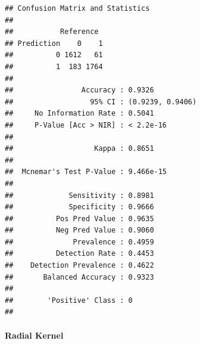 \documentclass[
]{article}
\newenvironment{Shaded}{\begin{snugshade}}{\end{snugshade}}
\newcommand{\AttributeTok}[1]{\textcolor[rgb]{0.77,0.63,0.00}{#1}}
\newcommand{\DecValTok}[1]{\textcolor[rgb]{0.00,0.00,0.81}{#1}}
\newcommand{\FloatTok}[1]{\textcolor[rgb]{0.00,0.00,0.81}{#1}}
\newcommand{\FunctionTok}[1]{\textcolor[rgb]{0.00,0.00,0.00}{#1}}
\newcommand{\NormalTok}[1]{#1}
\newcommand{\OtherTok}[1]{\textcolor[rgb]{0.56,0.35,0.01}{#1}}
\newcommand{\SpecialCharTok}[1]{\textcolor[rgb]{0.00,0.00,0.00}{#1}}
\begin{document}
\begin{Shaded}
\end{Shaded}

\begin{verbatim}
## Confusion Matrix and Statistics
## 
##           Reference
## Prediction    0    1
##          0 1612   61
##          1  183 1764
##                                           
##                Accuracy : 0.9326          
##                  95% CI : (0.9239, 0.9406)
##     No Information Rate : 0.5041          
##     P-Value [Acc > NIR] : < 2.2e-16       
##                                           
##                   Kappa : 0.8651          
##                                           
##  Mcnemar's Test P-Value : 9.466e-15       
##                                           
##             Sensitivity : 0.8981          
##             Specificity : 0.9666          
##          Pos Pred Value : 0.9635          
##          Neg Pred Value : 0.9060          
##              Prevalence : 0.4959          
##          Detection Rate : 0.4453          
##    Detection Prevalence : 0.4622          
##       Balanced Accuracy : 0.9323          
##                                           
##        'Positive' Class : 0               
## 
\end{verbatim}

\hypertarget{radial-kernel}{%
\paragraph{Radial Kernel}\label{radial-kernel}}
\end{document}
